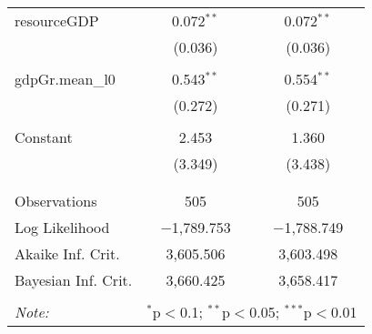 \begin{table}[!htbp]
\begin{tabular}{@{\extracolsep{5pt}}lcc}
 resourceGDP & 0.072$^{**}$ & 0.072$^{**}$ \\ 
  & (0.036) & (0.036) \\ 
  & & \\ 
 gdpGr.mean\_l0 & 0.543$^{**}$ & 0.554$^{**}$ \\ 
  & (0.272) & (0.271) \\ 
  & & \\ 
 Constant & 2.453 & 1.360 \\ 
  & (3.349) & (3.438) \\ 
  & & \\ 
\hline \\[-1.8ex] 
Observations & 505 & 505 \\ 
Log Likelihood & $-$1,789.753 & $-$1,788.749 \\ 
Akaike Inf. Crit. & 3,605.506 & 3,603.498 \\ 
Bayesian Inf. Crit. & 3,660.425 & 3,658.417 \\ 
\hline 
\hline \\[-1.8ex] 
\textit{Note:}  & \multicolumn{2}{r}{$^{*}$p$<$0.1; $^{**}$p$<$0.05; $^{***}$p$<$0.01} \\ 
\end{tabular} 
\end{table}  
